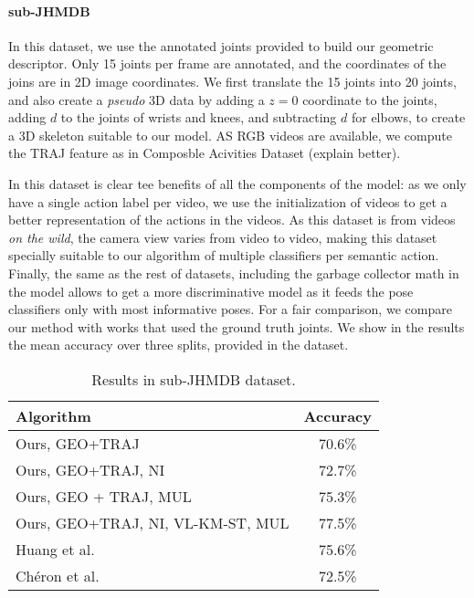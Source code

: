  \paragraph{sub-JHMDB} In this dataset, we use the annotated joints provided to build our geometric descriptor. Only 15 joints per frame are annotated, and the coordinates of the joins are in 2D image coordinates. We first translate the 15 joints into 20 joints, and also create a \emph{pseudo} 3D data by adding a $z=0$ coordinate to the joints, adding $d$ to the joints of wrists and knees, and subtracting $d$ for elbows, to create a 3D skeleton suitable to our model. AS RGB videos are available, we compute the TRAJ feature as in Composble Acivities Dataset (explain better).

In this dataset is clear tee benefits of all the components of the model: as we only have a single action label per video, we use the initialization of videos to get a better representation of the actions in the videos. As this dataset is from videos \emph{on the wild}, the camera view varies from video to video, making this dataset specially suitable to our algorithm of multiple classifiers per semantic action. Finally, the same as the rest of datasets, including the garbage collector math in the model allows to get a more discriminative model as it feeds the pose classifiers only with most informative poses. For a fair comparison, we compare our method with works that used the ground truth joints. We show in the results the mean accuracy over three splits, provided in the dataset.

\begin{table}
\centering
\begin{tabular}{|l|c|}
\hline
\textbf{Algorithm} & \textbf{Accuracy}\\
\hline
Ours, GEO+TRAJ & 70.6\%\\
Ours, GEO+TRAJ, NI & 72.7\% \\
Ours, GEO + TRAJ, MUL & 75.3\%\\
Ours, GEO+TRAJ, NI, VL-KM-ST, MUL &  77.5\% \\
\hline
Huang et al. \cite{Jhuang2013} & 75.6\% \\
Ch\'eron et al. \cite{Cheron2015} & 72.5\%\\
\hline
\end{tabular}
\caption{Results in sub-JHMDB dataset. }
\end{table}

